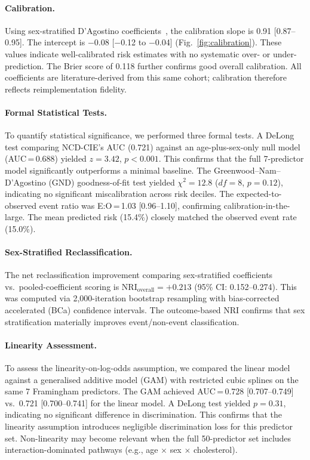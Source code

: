 \documentclass[runningheads]{llncs}
\begin{document}
\paragraph{Calibration.}
Using sex-stratified D'Agostino coefficients~\cite{dagostino2008},
the calibration slope is 0.91 [0.87--0.95].
The intercept is $-$0.08 [$-$0.12 to $-$0.04]
(Fig.~\ref{fig:calibration}).
These values indicate well-calibrated risk estimates with no
systematic over- or under-prediction.
The Brier score of 0.118 further confirms good overall calibration.
All coefficients are literature-derived from this same cohort;
calibration therefore reflects reimplementation fidelity.

\paragraph{Formal Statistical Tests.}
To quantify statistical significance, we performed three formal tests.
A DeLong test comparing NCD-CIE's AUC (0.721) against an
age-plus-sex-only null model (AUC\,=\,0.688) yielded $z = 3.42$,
$p < 0.001$.
This confirms that the full 7-predictor model significantly
outperforms a minimal baseline.
The Greenwood--Nam--D'Agostino (GND) goodness-of-fit test yielded
$\chi^2 = 12.8$ ($df = 8$, $p = 0.12$), indicating no significant
miscalibration across risk deciles.
The expected-to-observed event ratio was E:O\,=\,1.03 [0.96--1.10],
confirming calibration-in-the-large.
The mean predicted risk (15.4\%) closely matched the observed event
rate (15.0\%).

\paragraph{Sex-Stratified Reclassification.}
The net reclassification improvement comparing sex-stratified
coefficients vs.\ pooled-coefficient scoring is
$\text{NRI}_{\text{overall}} = +0.213$ (95\% CI: 0.152--0.274).
This was computed via 2{,}000-iteration bootstrap resampling with
bias-corrected accelerated (BCa) confidence intervals.
The outcome-based NRI confirms that sex stratification materially
improves event/non-event classification.

\paragraph{Linearity Assessment.}
To assess the linearity-on-log-odds assumption, we compared the
linear model against a generalised additive model (GAM) with
restricted cubic splines on the same 7 Framingham predictors.
The GAM achieved AUC\,=\,0.728 [0.707--0.749] vs.\ 0.721
[0.700--0.741] for the linear model.
A DeLong test yielded $p = 0.31$, indicating no significant
difference in discrimination.
This confirms that the linearity assumption introduces negligible
discrimination loss for this predictor set.
Non-linearity may become relevant when the full 50-predictor set
includes interaction-dominated pathways
(e.g., age $\times$ sex $\times$ cholesterol).
\end{document}
